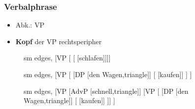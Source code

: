 \begin{frame}
\frametitle{Verbalphrase}

\begin{itemize}
	\item Abk.: VP
	\item \textbf{Kopf} der VP \ras rechtsperipher 
\end{itemize}

\begin{figure}[b]
	\begin{minipage}[b]{0.18\textwidth}
	\centering
	\footnotesize{
		\begin{forest}
		sm edges,
		[VP [ [ [schlafen]]]]
		\end{forest}
		}
  	\end{minipage}  
  	\pause            
	\begin{minipage}[b]{0.03\textwidth}
	\hfill
  	\end{minipage}
  	\begin{minipage}[b]{0.30\textwidth}
	\centering
	\footnotesize{
		\begin{forest}
		sm edges,
		[VP [	[DP [den Wagen,triangle]]
						[\zerobar{V} [kaufen]]
			]
		]			 
		\end{forest}
		}
  	\end{minipage}  
	\begin{minipage}[b]{0.03\textwidth}
	\hfill
  	\end{minipage}
  	\pause            
	\begin{minipage}[b]{0.41\textwidth}
	\centering
	\footnotesize{
		\begin{forest}
		sm edges,
		[VP [AdvP [schnell,triangle]]
			[VP 
		    [	[DP [den Wagen,triangle]]				
		    			[ [kaufen]]
			]]
		]			 
		\end{forest}
		}
  	\end{minipage}
\end{figure}

\end{frame}


